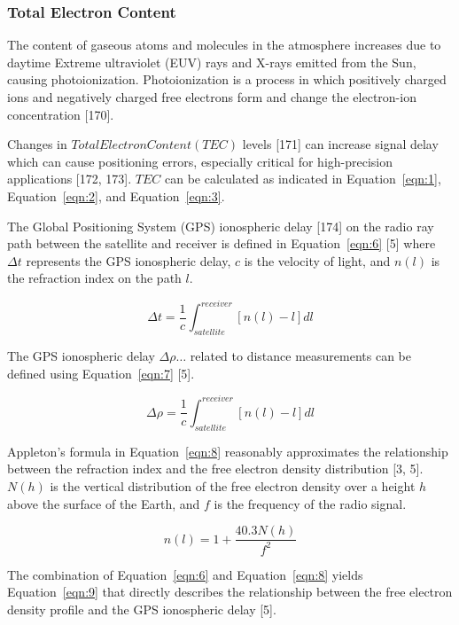 \documentclass[sn-mathphys-num]{sn-jnl}%
\begin{document}
\subsubsection{Total Electron Content}

The content of gaseous atoms and molecules in the atmosphere increases due to daytime Extreme ultraviolet (EUV) rays and X-rays emitted from the Sun, causing photoionization. Photoionization is a process in which positively charged ions and negatively charged free electrons form and change the electron-ion concentration [170].

Changes in $Total Electron Content (TEC)$ levels [171] can increase signal delay which can cause positioning errors, especially critical for high-precision applications [172, 173]. $TEC$ can be calculated as indicated in Equation~\ref{eqn:1}, Equation~\ref{eqn:2}, and Equation~\ref{eqn:3}. 

The Global Positioning System (GPS) ionospheric delay [174] on the radio ray path between the satellite and receiver is defined in Equation~\ref{eqn:6} [5] where $\Delta t$ represents the GPS ionospheric delay, $c$ is the velocity of light, and $n(l)$ is the refraction index on the path $l$.

\begin{equation}
	\Delta t = \frac{1}{c} \int_{satellite}^{receiver} \left[ n(l) - l \right]dl
	\label{eqn:6}
\end{equation}

The GPS ionospheric delay $\Delta \rho \dots$ related to distance measurements can be defined using Equation~\ref{eqn:7} [5].

\begin{equation}
	\Delta \rho = \frac{1}{c} \int_{satellite}^{receiver} \left[ n(l) - l \right]dl
	\label{eqn:7}
\end{equation}

Appleton’s formula in Equation~\ref{eqn:8} reasonably approximates the relationship between the refraction index and the free electron density distribution [3, 5]. $N(h)$ is the vertical distribution of the free electron density over a height $h$ above the surface of the Earth, and $f$ is the frequency of the radio signal.

\begin{equation}
	n(l) = 1 + \frac{40.3 N(h)}{f^{2}}
	\label{eqn:8}
\end{equation}

The combination of Equation~\ref{eqn:6} and Equation~\ref{eqn:8} yields Equation~\ref{eqn:9} that directly describes the relationship between the free electron density profile and the GPS ionospheric delay [5].
\end{document}
